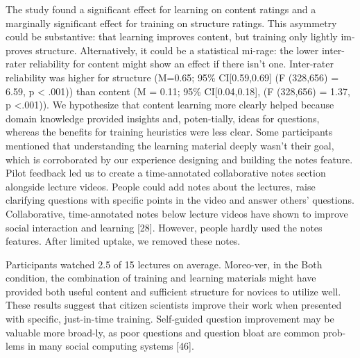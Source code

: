 The study found a significant effect for learning on content ratings and a marginally significant effect for training on structure ratings. This asymmetry could be substantive: that learning improves content, but training only lightly im-proves structure. Alternatively, it could be a statistical mi-rage: the lower inter-rater reliability for content might show an effect if there isn’t one. Inter-rater reliability was higher for structure (M=0.65; 95\% CI[0.59,0.69] (F (328,656) = 6.59, p < .001)) than content (M = 0.11; 95\% CI[0.04,0.18], (F (328,656) = 1.37, p <.001)).
We hypothesize that content learning more clearly helped because domain knowledge provided insights and, poten-tially, ideas for questions, whereas the benefits for training heuristics were less clear. Some participants mentioned that understanding the learning material deeply wasn’t their goal, which is corroborated by our experience designing and building the notes feature. Pilot feedback led us to create a time-annotated collaborative notes section alongside lecture videos. People could add notes about the lectures, raise clarifying questions with specific points in the video and answer others’ questions. Collaborative, time-annotated notes below lecture videos have shown to improve social interaction and learning [28]. However, people hardly used the notes features. After limited uptake, we removed these notes.

Participants watched 2.5 of 15 lectures on average. Moreo-ver, in the Both condition, the combination of training and learning materials might have provided both useful content and sufficient structure for novices to utilize well. These results suggest that citizen scientists improve their work when presented with specific, just-in-time training. Self-guided question improvement may be valuable more broad-ly, as poor questions and question bloat are common prob-lems in many social computing systems [46].

